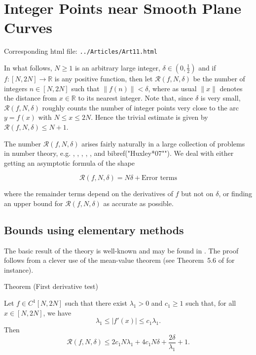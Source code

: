 \chapter{   Integer Points near Smooth Plane Curves}

Corresponding html file: \texttt{../Articles/Art11.html}










 
 


In what follows, $N \geqslant 1$ is an arbitrary large integer, $\delta \in
\left( 0,\frac{1}{2} \right)$ and if $f : [N,2N] \longrightarrow \mathbb {R}$
is any positive function, then let $\mathcal {R}(f,N,\delta)$ be the number of
integers $n \in [N,2N]$ such that $\lVert f(n) \rVert < \delta$, where as
usual $\lVert x \rVert$ denotes the distance from $x \in \mathbb {R}$ to its
nearest integer. Note that, since $\delta$ is very small, $\mathcal
{R}(f,N,\delta)$ roughly counts the number of integer points very close to the
arc $y = f(x)$ with $N \leqslant x \leqslant 2N$. Hence the trivial estimate
is given by $\mathcal {R}(f,N,\delta) \leqslant N+1$.  


The number $\mathcal {R}(f,N,\delta)$ arises fairly naturally in a large
collection of problems in number theory, e.g.
\cite{Filaseta*90},
\cite{Filaseta-Trifonov*96},
\cite{Huxley*96},
\cite{Huxley-Sargos*95},
\cite{Huxley-Sargos*06},
\cite{Huxley-Trifonov*96} and
bibref("Huxley*07"").
We deal with either getting an
asymptotic formula of the shape 

$$\mathcal {R}(f,N,\delta) = N \delta + \textrm{Error terms}$$

where the remainder terms depend on the derivatives of $f$ but not on
$\delta$, or finding an upper bound for $\mathcal {R}(f,N,\delta)$ as accurate
as possible.  



\section{Bounds using elementary methods}


The basic result of the theory is well-known and may be found in
\cite{Vinogradov*54}.
The proof follows from a clever use of the mean-value theorem (see
Theorem~5.6 of 
\cite{Bordelles*12} for instance).
\begin{thm}{Theorem (First derivative test)}

Let $f \in C^1 [N,2N]$ such that there exist $\lambda_1 >0$ and $c_1 \geqslant 1$ such that, for all $x \in [N,2N]$, we have
$$
   \lambda_1 \leqslant \bigl | f'(x) \bigr | \leqslant c_1 \lambda_1.
$$
Then
$$
  \mathcal {R}(f,N,\delta) \leqslant 2 c_1 N \lambda_1 + 4c_1 N \delta + \frac{2 \delta}{\lambda_1} + 1.$$
\end{thm}



